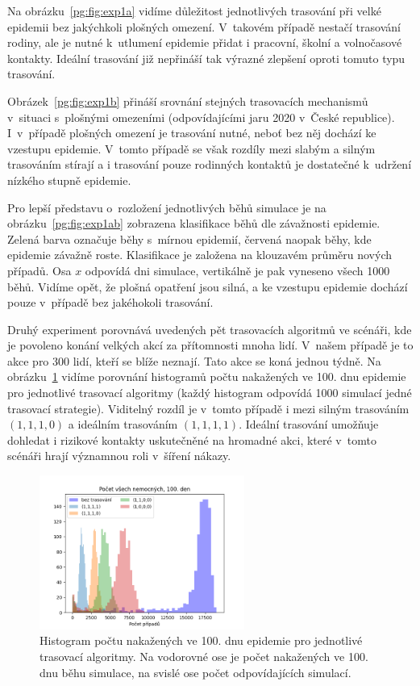 Na obrázku~\ref{pg:fig:exp1a} vidíme důležitost jednotlivých trasování při
velké epidemii bez jakýchkoli plošných omezení. V~takovém případě
nestačí trasování rodiny, ale je nutné k~utlumení epidemie přidat i
pracovní, školní a volnočasové kontakty. Ideální trasování již
nepřináší tak výrazné zlepšení oproti tomuto typu trasování.

Obrázek~\ref{pg:fig:exp1b} přináší srovnání stejných trasovacích
mechanismů v~situaci s~plošnými omezeními (odpovídajícími jaru 2020
v~České republice). I~v~případě plošných omezení je trasování nutné,
neboť bez něj dochází ke vzestupu epidemie. V~tomto případě
se však rozdíly mezi slabým a silným trasováním stírají a i trasování
pouze rodinných kontaktů je dostatečné k~udržení nízkého stupně epidemie. 

Pro lepší představu o~rozložení jednotlivých běhů simulace je na
obrázku~\ref{pg:fig:exp1ab} zobrazena klasifikace běhů dle závažnosti
epidemie. Zelená barva označuje běhy s~mírnou epidemií, červená naopak běhy,
kde epidemie závažně roste. Klasifikace je založena na klouzavém průměru
nových případů. Osa $x$ odpovídá dni simulace, vertikálně je pak vyneseno
všech 1000 běhů. Vidíme opět, že plošná opatření jsou silná, a ke vzestupu
epidemie dochází pouze v~případě bez jakéhokoli trasování. 


Druhý experiment porovnává uvedených pět trasovacích algoritmů ve
scénáři, kde je povoleno konání velkých akcí za přítomnosti mnoha
lidí. V~našem případě je to akce pro 300 lidí, kteří se blíže
neznají. Tato akce se koná jednou týdně. Na obrázku~\ref{pg:fig:exp2}
vidíme porovnání histogramů počtu nakažených ve 100. dnu epidemie pro
jednotlivé trasovací algoritmy (každý histogram odpovídá 1000
simulací jedné trasovací strategie). Viditelný rozdíl je v~tomto
případě i mezi silným trasováním $(1, 1, 1, 0)$ a ideálním trasováním
$(1, 1, 1, 1)$. Ideální trasování umožňuje dohledat i rizikové
kontakty uskutečněné na hromadné akci, které v~tomto scénáři hrají
významnou roli v~šíření nákazy.

\begin{figure}[ht!]
  \centering
  \includegraphics[width=0.6\textwidth]{pic/histogram_party2.png}
  \caption{Histogram  počtu nakažených ve 100. dnu epidemie pro jednotlivé trasovací algoritmy.
  Na vodorovné ose je počet nakažených ve 100. dnu běhu simulace, na svislé ose počet odpovídajících simulací.}
  \label{pg:fig:exp2}
\end{figure}


